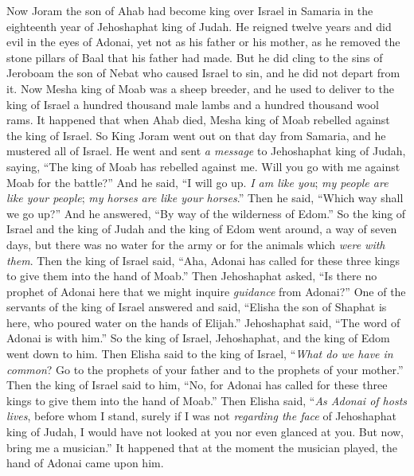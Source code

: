 \begin{biblechapter} %
 Now Joram the son of Ahab had become king over Israel in Samaria in the eighteenth year of Jehoshaphat king of Judah. He reigned twelve years
\verse and did evil in the eyes of Adonai, yet not as his father or his mother, as he removed the stone pillars of Baal that his father had made.
\verse But he did cling to the sins of Jeroboam the son of Nebat who caused Israel to sin, and he did not depart from it.
\verse Now Mesha king of Moab was a sheep breeder, and he used to deliver to the king of Israel a hundred thousand male lambs and a hundred thousand wool rams.
\verse It happened that when Ahab died, Mesha king of Moab rebelled against the king of Israel.
\verse So King Joram went out on that day from Samaria, and he mustered all of Israel.
\verse He went and sent \textit{a message} to Jehoshaphat king of Judah, saying, “The king of Moab has rebelled against me. Will you go with me against Moab for the battle?” And he said, “I will go up. \textit{I am like you}; \textit{my people are like your people}; \textit{my horses are like your horses}.”
\verse Then he said, “Which way shall we go up?” And he answered, “By way of the wilderness of Edom.”
\verse So the king of Israel and the king of Judah and the king of Edom went around, a way of seven days, but there was no water for the army or for the animals which \textit{were with them}.
\verse Then the king of Israel said, “Aha, Adonai has called for these three kings to give them into the hand of Moab.”
\verse Then Jehoshaphat asked, “Is there no prophet of Adonai here that we might inquire \textit{guidance} from Adonai?” One of the servants of the king of Israel answered and said, “Elisha the son of Shaphat is here, who poured water on the hands of Elijah.”
\verse Jehoshaphat said, “The word of Adonai is with him.” So the king of Israel, Jehoshaphat, and the king of Edom went down to him.
\verse Then Elisha said to the king of Israel, “\textit{What do we have in common}? Go to the prophets of your father and to the prophets of your mother.” Then the king of Israel said to him, “No, for Adonai has called for these three kings to give them into the hand of Moab.”
\verse Then Elisha said, “\textit{As Adonai of hosts lives}, before whom I stand, surely if I was not \textit{regarding the face} of Jehoshaphat king of Judah, I would have not looked at you nor even glanced at you.
\verse But now, bring me a musician.” It happened that at the moment the musician played, the hand of Adonai came upon him.

\end{biblechapter}
